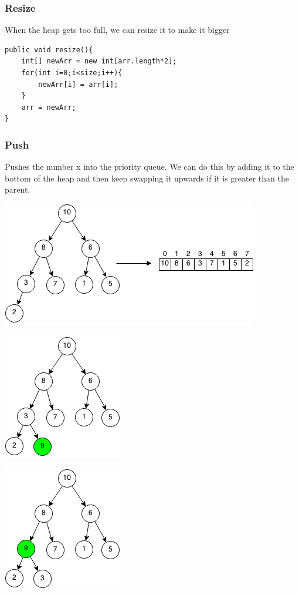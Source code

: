 \documentclass[11pt,oneside]{book}
\makeatletter
\def\maxwidth#1{\ifdim\Gin@nat@width>#1 #1\else\Gin@nat@width\fi}
\makeatother
\begin{document}
\subsubsection{Resize}

When the heap gets too full, we can resize it to make it bigger

\begin{lstlisting}
public void resize(){
    int[] newArr = new int[arr.length*2];
    for(int i=0;i<size;i++){
        newArr[i] = arr[i];
    }
    arr = newArr;
}
\end{lstlisting}

\subsubsection{Push}

Pushes the number x into the priority queue. We can do this by adding it to the bottom of the heap and then keep swapping it upwards if it is greater than the parent.

\vspace{5px}\includegraphics[width=\maxwidth{\textwidth}]{maxheap.png}

\vspace{5px}\includegraphics[width=\maxwidth{\textwidth}]{maxheappush.png}

\vspace{5px}\includegraphics[width=\maxwidth{\textwidth}]{maxheappush2.png}
\end{document}
